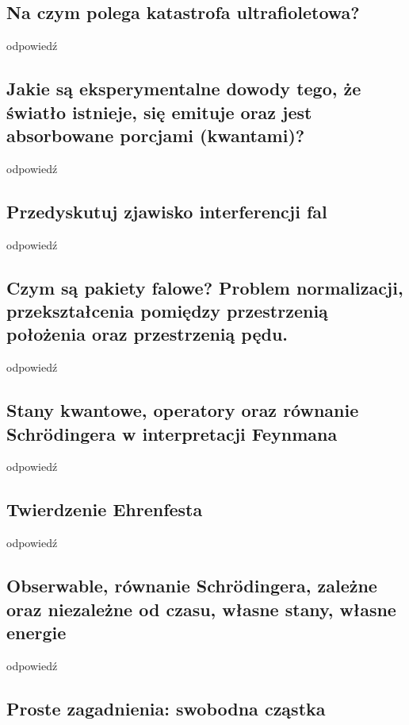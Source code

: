 \subsection{Na czym polega katastrofa ultrafioletowa?}

odpowiedź

\subsection{Jakie są eksperymentalne dowody tego, że światło istnieje, się emituje oraz jest absorbowane porcjami (kwantami)?}

odpowiedź

\subsection{Przedyskutuj zjawisko interferencji fal}

odpowiedź

\subsection{Czym są pakiety falowe? Problem normalizacji, przekształcenia pomiędzy przestrzenią położenia oraz przestrzenią pędu.}

odpowiedź

\subsection{Stany kwantowe, operatory oraz równanie Schrödingera w interpretacji Feynmana}

odpowiedź

\subsection{Twierdzenie Ehrenfesta}

odpowiedź

\subsection{Obserwable, równanie Schrödingera, zależne oraz niezależne od czasu, własne stany, własne energie}

odpowiedź

\subsection{Proste zagadnienia: swobodna cząstka}

